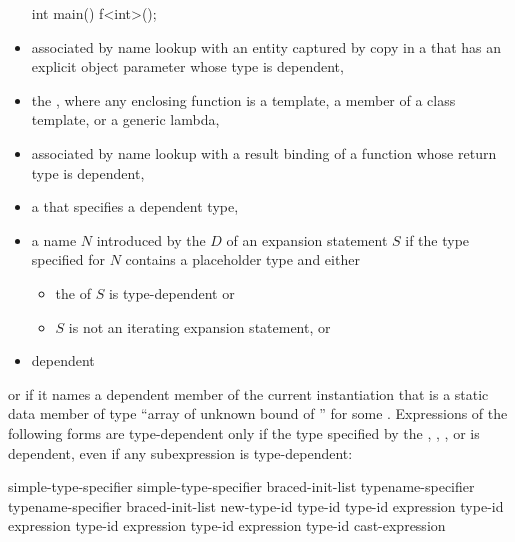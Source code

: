 \begin{itemize}
\begin{example}
\begin{codeblock}
int main() {
  f<int>();
}
\end{codeblock}
\end{example}
\item
associated by name lookup with
an entity captured by copy
in a 
that has an explicit object parameter whose type is dependent,
\item
the
, where any enclosing function is a
template, a member of a class template, or a generic lambda,
\item
associated by name lookup
with a result binding of a function
whose return type is dependent,
\item
a  that specifies a dependent type,
\item
a name $N$ introduced by the  $D$
of an expansion statement $S$
if the type specified for $N$ contains a placeholder type and either
\begin{itemize}
\item the  of $S$ is type-dependent or
\item $S$ is not an iterating expansion statement, or
\end{itemize}
\item
dependent
\end{itemize}
or if it names a dependent member of the current instantiation that is a static
data member of type
``array of unknown bound of '' for some .
Expressions of the following forms are type-dependent only if the type
specified by the
,
,
,
or
is dependent, even if any subexpression is type-dependent:

\begin{ncsimplebnf}
simple-type-specifier \terminal{(}  \terminal{)}\br
simple-type-specifier braced-init-list\br
typename-specifier \terminal{(}  \terminal{)}\br
typename-specifier braced-init-list\br
\opt{\terminal{::}}   new-type-id \br
\opt{\terminal{::}}   \terminal{(} type-id \terminal{)} \br
{} \terminal{<} type-id \terminal{>} \terminal{(} expression \terminal{)}\br
{} \terminal{<} type-id \terminal{>} \terminal{(} expression \terminal{)}\br
{} \terminal{<} type-id \terminal{>} \terminal{(} expression \terminal{)}\br
{} \terminal{<} type-id \terminal{>} \terminal{(} expression \terminal{)}\br
\terminal{(} type-id \terminal{)} cast-expression
\end{ncsimplebnf}

